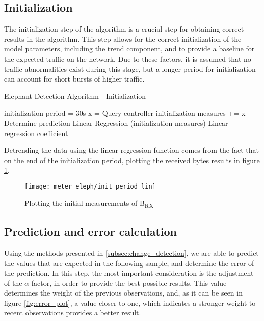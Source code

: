 \subsection{Initialization}

The initialization step of the algorithm is a crucial step for obtaining correct results in the algorithm. This step allows for the correct initialization of the model parameters, including the trend component, and to provide a 
baseline for the expected traffic on the network. Due to these factors, it is assumed that no traffic abnormalities exist during this stage, but a longer period for initialization can account for short bursts of higher traffic.

\begin{algorithm}[H]
    \caption{Elephant Detection Algorithm - Initialization} \label{alg:high_level}
    \begin{algorithmic}[1]
            \State initialization period = 30s
                \State x = Query controller
                \State initialization measures += x
                \State Determine prediction
            \EndWhile
            \State Linear Regression (initialization measures)
        \State \Return Linear regression coefficient
    \end{algorithmic}
\end{algorithm}

\par Detrending the data using the linear regression function comes from the fact that on the end of the initialization period, plotting the received bytes results in figure \ref{fig:init_plot}.

\begin{figure} 
    \centering
    \texttt{[image: meter\_eleph/init\_period\_lin]}
    \caption {Plotting the initial measurements of B\textsubscript{RX}}
    \label{fig:init_plot}
\end{figure} 

\subsection{Prediction and error calculation}

Using the methods presented in \ref{subsec:change_detection}, we are able to predict the values that are expected in the following sample, and determine the error of the prediction. In this step, the most important consideration is the adjustment of
the $\alpha$ factor, in order to provide the best possible results. This value determines the weight of the previous observations, and, as it can be seen in figure \ref{fig:error_plot}, a value closer to one, which indicates a stronger weight to
recent observations provides a better result.

